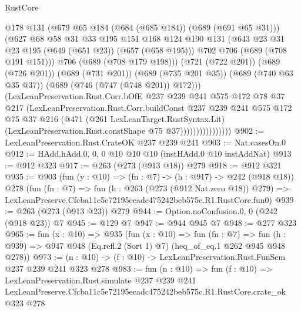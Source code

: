 \begin{lexlean}{RustCore}
\begin{coremodule}
                                @178
                                @131
                                (@679 @65 @184 (@684 (@685 @184)) (@689 (@691 @65 @31)))
                                (@627
                                  @68
                                  @58
                                  @31
                                  @33
                                  @195
                                  @151
                                  @168
                                  @124
                                  @190
                                  @131
                                  (@643 @23 @31 @23 @195 (@649 (@651 @23)) (@657 (@658 @195)))
                                  @702
                                  @706
                                  (@689 (@708 @191 @151)))
                                @706
                                (@689 (@708 @179 @198)))
                              (@721 (@722 @201))
                              (@689 (@726 @201))
                              (@689 (@731 @201))
                              (@689 (@735 @201 @35))
                              (@689 (@740 @63 @35 @37))
                              (@689 (@746 (@747 (@748 @201)) @172)))
                            (LexLeanPreservation.Rust.Corr.bOfE
                              @237
                              @239
                              @241
                              @575
                              @172
                              @78
                              @37
                              @217
                              (LexLeanPreservation.Rust.Corr.buildConst
                                @237
                                @239
                                @241
                                @575
                                @172
                                @75
                                @37
                                @216
                                (@471
                                  (@261 LexLeanTarget.RustSyntax.Lit)
                                  (LexLeanPreservation.Rust.constShape @75 @37))))))))))))))))
@902 := LexLeanPreservation.Rust.CrateOK @237 @239 @241
@903 := Nat.casesOn.{0}
@912 := HAdd.hAdd.{0, 0, 0} @10 @10 @10 (instHAdd.{0} @10 instAddNat)
@913 := @912 @323
@917 := @263 (@273 (@913 @18)) @279
@918 := @912 @321
@935 := @903
    (fun (y : @10) => (fn : @7) -> (h : @917) -> @242 (@918 @18))
    @278
    (fun (fn : @7) =>
    fun (h : @263 (@273 (@912 Nat.zero @18)) @279) =>
    LexLeanPreserve.Cfcba11c5e72195ecadc475242beb575c.R1.RustCore.fun0)
@939 := @263 (@273 (@913 @23)) @279
@944 := Option.noConfusion.{0, 0} (@242 (@918 @23)) @7
@945 := @129 @7
@947 := @944 @945 @7
@948 := @277 @323
@965 := fun (x : @10) =>
  @935
    (fun (x : @10) =>
    fun (fn : @7) =>
    fun (h : @939) => @947 @948 (Eq.refl.{2} (Sort 1) @7) (heq_of_eq.{1} @262 @945 @948 @278))
@973 := (n : @10) -> (f : @10) -> LexLeanPreservation.Rust.FunSem @237 @239 @241 @323 @278
@983 := fun (n : @10) =>
  fun (f : @10) =>
  LexLeanPreservation.Rust.simulate
    @237
    @239
    @241
    LexLeanPreserve.Cfcba11c5e72195ecadc475242beb575c.R1.RustCore.crate_ok
    @323
    @278
\end{coremodule}
\end{lexlean}
